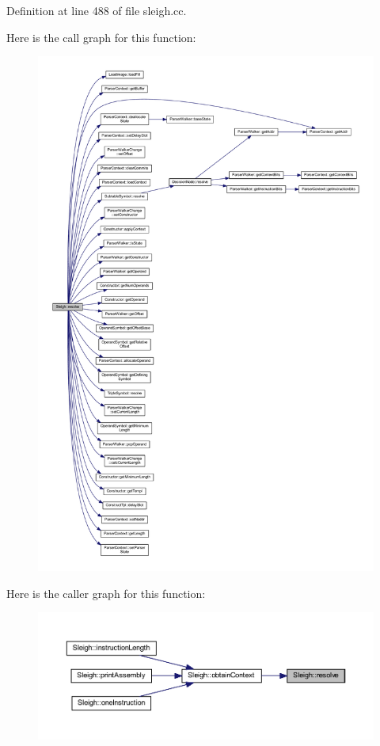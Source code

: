 Definition at line 488 of file sleigh.\+cc.

Here is the call graph for this function\+:
\nopagebreak
\begin{figure}[H]
\begin{center}
\leavevmode
\includegraphics[width=350pt]{class_sleigh_a54c142d4cf4954c6e9f5c32e9e96a215_cgraph}
\end{center}
\end{figure}
Here is the caller graph for this function\+:
\nopagebreak
\begin{figure}[H]
\begin{center}
\leavevmode
\includegraphics[width=350pt]{class_sleigh_a54c142d4cf4954c6e9f5c32e9e96a215_icgraph}
\end{center}
\end{figure}
\mbox{\label{class_sleigh_a6feb982ab58134d1ad3730d9e252906c}} 

